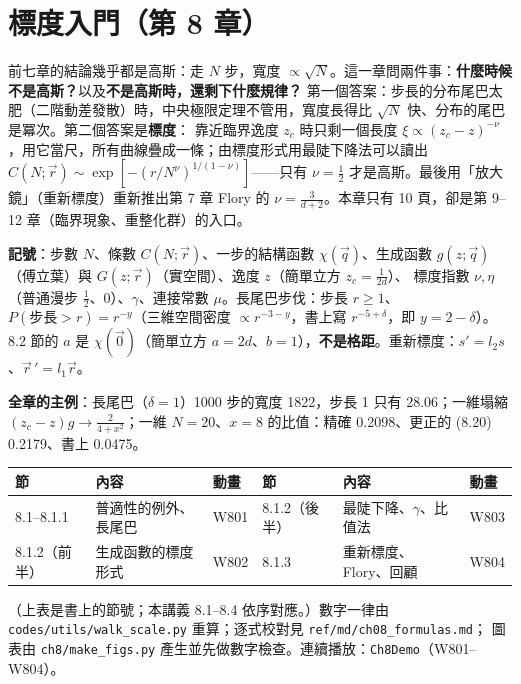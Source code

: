 

\section{標度入門（第 8 章）}

\begin{keybox}[先看這裡]
前七章的結論幾乎都是高斯：走 $N$ 步，寬度 $\propto\sqrt N$。這一章問兩件事：\textbf{什麼時候不是高斯？}以及\textbf{不是高斯時，還剩下什麼規律？}
第一個答案：步長的分布尾巴太肥（二階動差發散）時，中央極限定理不管用，寬度長得比 $\sqrt N$ 快、分布的尾巴是冪次。第二個答案是\textbf{標度}：
靠近臨界逸度 $z_c$ 時只剩一個長度 $\xi\propto(z_c-z)^{-\nu}$，用它當尺，所有曲線疊成一條；由標度形式用最陡下降法可以讀出
$C(N;\vec r)\sim\exp[-(r/N^\nu)^{1/(1-\nu)}]$——只有 $\nu=\frac12$ 才是高斯。最後用「放大鏡」（重新標度）重新推出第 7 章 Flory 的 $\nu=\frac3{d+2}$。本章只有 10 頁，卻是第 9--12 章（臨界現象、重整化群）的入口。

\textbf{記號}：步數 $N$、條數 $C(N;\vec r)$、一步的結構函數 $\chi(\vec q)$、生成函數 $g(z;\vec q)$（傅立葉）與 $G(z;\vec r)$（實空間）、逸度 $z$（簡單立方 $z_c=\frac1{2d}$）、
標度指數 $\nu,\eta$（普通漫步 $\frac12$、0）、$\gamma$、連接常數 $\mu$。長尾巴步伐：步長 $r\ge1$、$P(\text{步長}>r)=r^{-y}$（三維空間密度 $\propto r^{-3-y}$，書上寫 $r^{-5+\delta}$，即 $y=2-\delta$）。
8.2 節的 $a$ 是 $\chi(\vec 0)$（簡單立方 $a=2d$、$b=1$），\textbf{不是格距}。重新標度：$s'=l_2s$、$\vec r\,'=l_1\vec r$。

\textbf{全章的主例}：長尾巴（$\delta=1$）1000 步的寬度 1822，步長 1 只有 28.06；一維塌縮 $(z_c-z)g\to\frac2{4+x^2}$；一維 $N=20$、$x=8$ 的比值：精確 0.2098、更正的 (8.20) 0.2179、書上 0.0475。
\begin{center}
\small
\begin{tabular}{@{}lll@{\qquad}lll@{}}
\toprule
節 & 內容 & 動畫 & 節 & 內容 & 動畫\\
\midrule
8.1--8.1.1 & 普適性的例外、長尾巴 & W801 & 8.1.2（後半） & 最陡下降、$\gamma$、比值法 & W803\\
8.1.2（前半） & 生成函數的標度形式 & W802 & 8.1.3 & 重新標度、Flory、回顧 & W804\\
\bottomrule
\end{tabular}
\end{center}
（上表是書上的節號；本講義 8.1--8.4 依序對應。）數字一律由 \texttt{codes/utils/walk\_scale.py} 重算；逐式校對見 \texttt{ref/md/ch08\_formulas.md}；
圖表由 \texttt{ch8/make\_figs.py} 產生並先做數字檢查。連續播放：\texttt{Ch8Demo}（W801--W804）。
\end{keybox}

